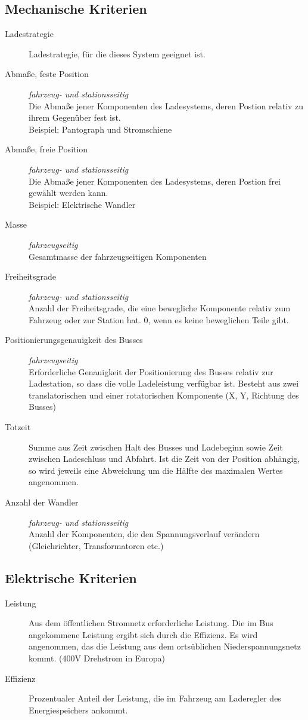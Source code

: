 \subsection{Mechanische Kriterien}
\begin{description}
	\item [Ladestrategie] Ladestrategie, für die dieses System geeignet ist.
	\item [Abmaße, feste Position] \emph{fahrzeug- und stationsseitig}\\
	Die Abmaße jener Komponenten des Ladesystems, deren Postion relativ zu ihrem Gegenüber fest ist.\\
	Beispiel: Pantograph und Stromschiene
	\item [Abmaße, freie Position] \emph{fahrzeug- und stationsseitig}\\
	Die Abmaße jener Komponenten des Ladesystems, deren Postion frei gewählt werden kann.\\
	Beispiel: Elektrische Wandler
	\item [Masse] \emph{fahrzeugseitig}\\
	Gesamtmasse der fahrzeugseitigen Komponenten
	\item [Freiheitsgrade] \emph{fahrzeug- und stationsseitig}\\
	Anzahl der Freiheitsgrade, die eine bewegliche Komponente relativ zum Fahrzeug oder zur Station hat. 0, wenn es keine beweglichen Teile gibt.
	\item [Positionierungsgenauigkeit des Busses] \emph{fahrzeugseitig} \\
	Erforderliche Genauigkeit der Positionierung des Busses relativ zur Ladestation, so dass die volle Ladeleistung verfügbar ist. Besteht aus zwei translatorischen und einer rotatorischen Komponente (X, Y, Richtung des Busses)
	\item [Totzeit]
	Summe aus Zeit zwischen Halt des Busses und Ladebeginn sowie Zeit zwischen Ladeschluss und Abfahrt. Ist die Zeit von der Position abhängig, so wird jeweils eine Abweichung um die Hälfte des maximalen Wertes angenommen.
	\item [Anzahl der Wandler] \emph{fahrzeug- und stationsseitig}\\
	Anzahl der Komponenten, die den Spannungsverlauf verändern (Gleichrichter, Transformatoren etc.)
\end{description}

\subsection{Elektrische Kriterien}
\begin{description}
	\item [Leistung]
	Aus dem öffentlichen Stromnetz erforderliche Leistung. Die im Bus angekommene Leistung ergibt sich durch die Effizienz. Es wird angenommen, das die Leistung aus dem ortsüblichen Niederspannungsnetz kommt. (400V Drehstrom in Europa)
	\item [Effizienz]
	Prozentualer Anteil der Leistung, die im Fahrzeug am Laderegler des Energiespeichers ankommt.		
\end{description}

